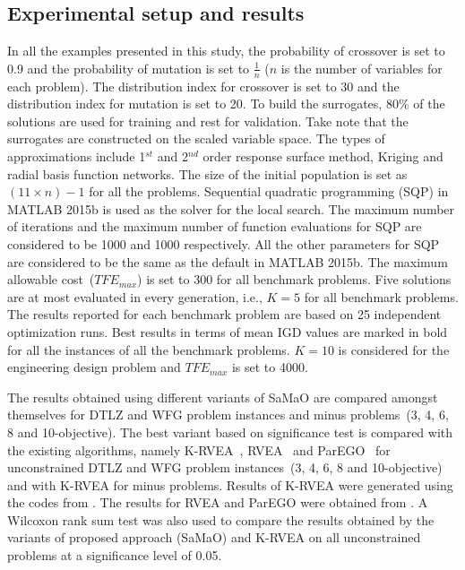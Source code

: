 \subsection{Experimental setup and results}
\label{subsec:KHTsubsec:2}
In all the examples presented in this study, the probability of crossover is set to 0.9 and the probability of mutation is set to $\frac{1}{n}$ ($n$ is the number of variables for each problem). The distribution index for crossover is set to 30 and the distribution index for mutation is set to 20. To build the surrogates, 80\% of the solutions are used for training and rest for validation. Take note that the surrogates are constructed on the scaled variable space. The types of approximations include 1$^{st}$ and 2$^{nd}$ order response surface method, Kriging and radial basis function networks. The size of the initial population is set as $(11\times n)-1$ for all the problems. Sequential quadratic programming (SQP) in MATLAB 2015b is used as the solver for the local search. The maximum number of iterations and the maximum number of function evaluations for SQP are considered to be 1000 and 1000 respectively. All the other parameters for SQP are considered to be the same as the default in MATLAB 2015b. The maximum allowable cost~($TFE_{max}$) is set to 300 for all benchmark problems. Five solutions are at most evaluated in every generation, i.e., $K = 5$ for all benchmark problems. The results reported for each benchmark problem are based on 25 independent optimization runs. Best results in terms of mean IGD values are marked in bold for all the instances of all the benchmark problems. $K = 10$ is considered for the engineering design problem and $TFE_{max}$ is set to 4000.

The results obtained using different variants of SaMaO are compared amongst themselves for DTLZ and WFG problem instances and minus problems~(3, 4, 6, 8 and 10-objective). The best variant based on significance test is compared with the existing algorithms, namely K-RVEA~\cite{KHTchugh2016krvea}, RVEA~\cite{KHTCheng2016many} and ParEGO~\cite{KHTknowles2006pha} for unconstrained DTLZ and WFG problem instances~(3, 4, 6, 8 and 10-objective) and with K-RVEA for minus problems. Results of K-RVEA were generated using the codes from \cite{KHTplatemo}. The results for RVEA and ParEGO were obtained from \cite{KHTchugh2016krvea}. A Wilcoxon rank sum test was also used to compare the results obtained by the variants of proposed approach (SaMaO) and K-RVEA on all unconstrained problems at a significance level of 0.05. 


